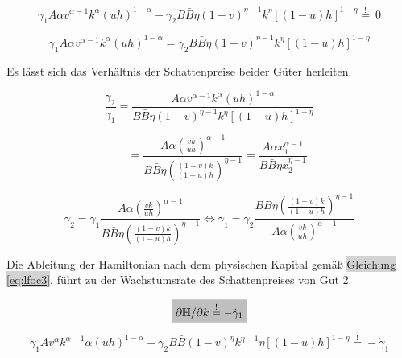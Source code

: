 	\begin{equation}
		\gamma_1A\alpha v^{\alpha-1}k^\alpha(uh)^{1-\alpha}-\gamma_2B\bar{B}\eta(1-v)^{\eta-1}k^\eta[(1-u)h]^{1-\eta}\overset{!}{=}~0
	\end{equation}


	\begin{equation}
		\gamma_1A\alpha v^{\alpha-1}k^\alpha(uh)^{1-\alpha}=\gamma_2B\bar{B}\eta(1-v)^{\eta-1}k^\eta[(1-u)h]^{1-\eta}
	\end{equation}


Es lässt sich das Verhältnis der Schattenpreise beider Güter herleiten.


	\begin{equation}
		\frac{\gamma_2}{\gamma_1}=\frac{A\alpha v^{\alpha-1}k^\alpha(uh)^{1-\alpha}}{B\bar{B}\eta(1-v)^{\eta-1}k^\eta[(1-u)h]^{1-\eta}}\label{Verhaltnisherleitung1}
	\end{equation}


	\begin{equation}
		\quad ~~=\frac{A\alpha \left(\frac{vk}{uh}\right)^{\alpha-1}}{B\bar{B}\eta\left(\frac{(1-v)k}{(1-u)h}\right)^{\eta-1}}=\frac{A\alpha x_1^{\alpha-1}}{B\bar{B}\eta x_2^{\eta-1}}\label{Verhaltnisherleitung1a}
	\end{equation}


	\begin{equation}
		\gamma_2=\gamma_1\frac{A\alpha \left(\frac{vk}{uh}\right)^{\alpha-1}}{B\bar{B}\eta\left(\frac{(1-v)k}{(1-u)h}\right)^{\eta-1}}\Longleftrightarrow \gamma_1=\gamma_2\frac{B\bar{B}\eta\left(\frac{(1-v)k}{(1-u)h}\right)^{\eta-1}}{A\alpha \left(\frac{vk}{uh}\right)^{\alpha-1}}\label{Verhaltnisherleitung2}
	\end{equation}


Die Ableitung der Hamiltonian nach dem physischen Kapital gemä{\ss} \colorbox{lightgray}{Gleichung \eqref{eq:lfoc3}}, führt zu der Wachstumsrate des Schattenpreises von Gut 2.


	\begin{equation*}
		\colorbox{lightgray}{$\partial\mathbb{H}/\partial k\overset{!}{=}-\dot{\gamma}_1$}
	\end{equation*}


	\begin{equation}
		\gamma_{1}A v^{\alpha}k^{\alpha -1} \alpha(u h)^{1- \alpha} + \gamma_{2}B\bar{B}(1- v)^{\eta} k^{\eta -1} \eta \left [ (1-u)h \right ]^{1- \eta}\overset{!}{=} - \dot{\gamma}_{1}\label{BedingungFoc3}
	\end{equation}



